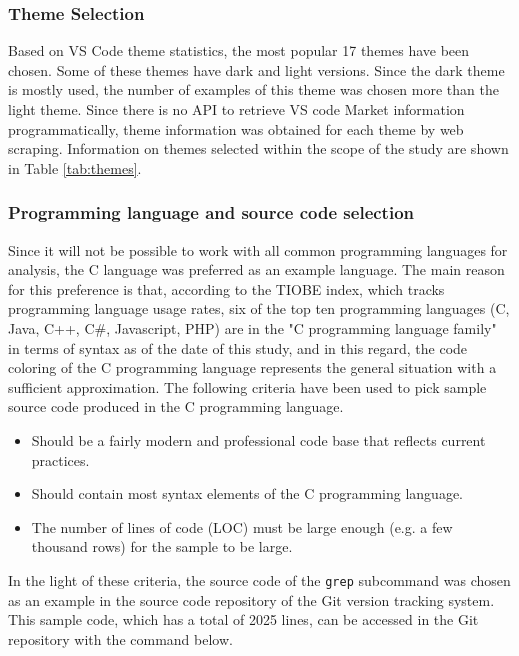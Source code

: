 \documentclass{article}
\begin{document}
\subsubsection{Theme Selection} \label{sec:material-methods.inputs.themes}

Based on VS Code theme statistics\cite{vs2022thememarket}, the most popular 17 themes have been chosen. Some of these
themes have dark and light versions. Since the dark theme is mostly used\cite{sarath2016prefer}, the number of examples
of this theme was chosen more than the light theme. Since there is no API to retrieve VS code Market information
programmatically, theme information was obtained for each theme by web scraping. Information on themes selected within
the scope of the study are shown in Table \ref{tab:themes}. 

\subsubsection{Programming language and source code selection} \label{sec:material-methods.inputs.language}

Since it will not be possible to work with all common programming languages for analysis, the C language was preferred as an example language. The main reason for this preference is that, according to the TIOBE index, which tracks programming language usage rates, six of the top ten programming languages (C, Java, C++, C\#, Javascript, PHP) are in the "C programming language family" in terms of syntax as of the date of this study\cite{tiobe2022index}, and in this regard, the code coloring of the C programming language represents the general situation with a sufficient approximation. The following criteria have been used to pick sample source code produced in the C programming language.

\begin{itemize}
  \item Should be a fairly modern and professional code base that reflects current practices.

  \item Should contain most syntax elements of the C programming language.

  \item The number of lines of code (LOC) must be large enough (e.g. a few thousand rows) for the sample to be large.
\end{itemize}

In the light of these criteria, the source code\cite{github2022gitgrep} of the \texttt{grep} subcommand\cite{git2022grep} was chosen as an example in the source code repository\cite{github2022gitrepo} of the Git\cite{git2022homepage} version tracking system. This sample code, which has a total of 2025 lines, can be accessed in the Git repository with the command below.
\end{document}
